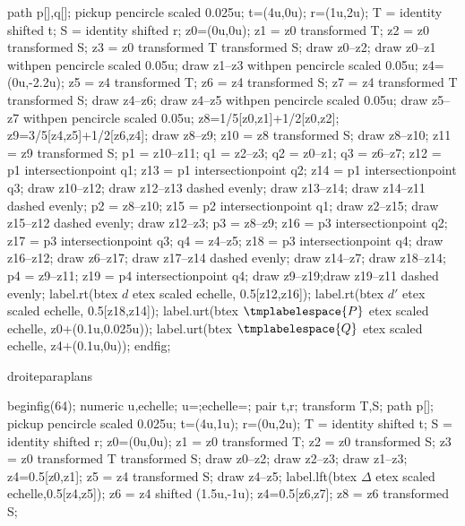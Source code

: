 {{{\begin{mplibcode}[PfLAH]
				path p[],q[];
				pickup pencircle scaled 0.025u;
				t=(4u,0u); r=(1u,2u);
				T = identity shifted t;
				S = identity shifted r;
				z0=(0u,0u);
				z1 = z0 transformed T;
				z2 = z0 transformed S;
				z3 = z0 transformed T transformed S;
				draw z0--z2;
				draw z0--z1 withpen pencircle scaled 0.05u;
				draw z1--z3 withpen pencircle scaled 0.05u;
				z4=(0u,-2.2u);
				z5 = z4 transformed T;
				z6 = z4 transformed S;
				z7 = z4 transformed T transformed S;
				draw z4--z6;
				draw z4--z5 withpen pencircle scaled 0.05u;
				draw z5--z7 withpen pencircle scaled 0.05u;
				z8=1/5[z0,z1]+1/2[z0,z2];
				z9=3/5[z4,z5]+1/2[z6,z4];
				draw z8--z9;
				z10 = z8 transformed S;
				draw z8--z10;
				z11 = z9 transformed S;
				p1 = z10--z11;
				q1 = z2--z3;
				q2 = z0--z1;
				q3 = z6--z7;
				z12 = p1 intersectionpoint q1;
				z13 = p1 intersectionpoint q2;
				z14 = p1 intersectionpoint q3;
				draw z10--z12;
				draw z12--z13 dashed evenly;
				draw z13--z14;
				draw z14--z11 
				dashed evenly;
				p2 = z8--z10;
				z15 = p2 intersectionpoint q1;
				draw z2--z15;
				draw z15--z12 dashed evenly;
				draw z12--z3;
				p3 = z8--z9;
				z16 = p3 intersectionpoint q2;
				z17 = p3 intersectionpoint q3;
				q4 = z4--z5;
				z18 = p3 intersectionpoint q4;
				draw z16--z12;
				draw z6--z17;
				draw z17--z14 dashed evenly;
				draw z14--z7;
				draw z18--z14;
				p4 = z9--z11;
				z19 = p4 intersectionpoint q4;
				draw z9--z19;draw z19--z11 dashed evenly;
				label.rt(btex $d$ etex scaled echelle, 0.5[z12,z16]);
				label.rt(btex $d'$ etex scaled echelle, 0.5[z18,z14]);
				label.urt(btex $\tmplabelespace{P}$ etex scaled echelle, z0+(0.1u,0.025u));
				label.urt(btex $\tmplabelespace{Q}$ etex scaled echelle, z4+(0.1u,0u));
				endfig;
			\end{mplibcode}
		}%
		{droiteparaplans}{%
			\begin{mplibcode}[PfLAI]
				beginfig(64);
				numeric u,echelle;
				u=\scaleminischemspace*1cm;echelle=\scaleminischemspace;
				pair t,r;
				transform T,S;
				path p[];
				pickup pencircle scaled 0.025u;
				t=(4u,1u); r=(0u,2u);
				T = identity shifted t;
				S = identity shifted r;
				z0=(0u,0u);
				z1 = z0 transformed T;
				z2 = z0 transformed S;
				z3 = z0 transformed T transformed S;
				draw z0--z2;
				draw z2--z3;
				draw z1--z3;
				z4=0.5[z0,z1];
				z5 = z4 transformed S;
				draw z4--z5;
				label.lft(btex $\Delta$ etex scaled echelle,0.5[z4,z5]);
				z6 = z4 shifted (1.5u,-1u);
				z4=0.5[z6,z7];
				z8 = z6 transformed S;

\end{mplibcode}}}}
